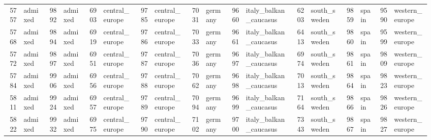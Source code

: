 \begin{table}[h]
{\begin{tabular}{rl|rl|rl|rl|rl|rl|rl|rl|rl}
			5757                   & admixed         & 9892                   & admixed         & 6903                   & central\_europe & 9785                   & central\_europe & 7031                   & germany                 & 9660                   & italy\_balkan\_caucasus & 6203                   & south\_sweden   & 9859                   & spain           & \multicolumn{1}{r}{9590} & western\_europe \\
			5768                   & admixed         & 9894                   & admixed         & 6919                   & central\_europe & 9786                   & central\_europe & 7033                   & germany                 & 9661                   & italy\_balkan\_caucasus & 6413                   & south\_sweden   & 9860                   & spain           & \multicolumn{1}{r}{9599} & western\_europe \\
			5772                   & admixed         & 9897                   & admixed         & 6951                   & central\_europe & 9787                   & central\_europe & 7036                   & germany                 & 9697                   & italy\_balkan\_caucasus & 6974                   & south\_sweden   & 9861                   & spain           & \multicolumn{1}{r}{9809} & western\_europe \\
			5784                   & admixed         & 9906                   & admixed         & 6956                   & central\_europe & 9788                   & central\_europe & 7062                   & germany                 & 9698                   & italy\_balkan\_caucasus & 7013                   & south\_sweden   & 9864                   & spain           & \multicolumn{1}{r}{9823} & western\_europe \\
			5811                   & admixed         & 9924                   & admixed         & 6957                   & central\_europe & 9789                   & central\_europe & 7094                   & germany                 & 9699                   & italy\_balkan\_caucasus & 7164                   & south\_sweden   & 9866                   & spain           & \multicolumn{1}{r}{9826} & western\_europe \\
			5822                   & admixed         & 9932                   & admixed         & 6975                   & central\_europe & 9790                   & central\_europe & 7102                   & germany                 & 9700                   & italy\_balkan\_caucasus & 7343                   & south\_sweden   & 9867                   & spain           & \multicolumn{1}{r}{9827} & western\_europe \\

\end{tabular}}
\end{table}
